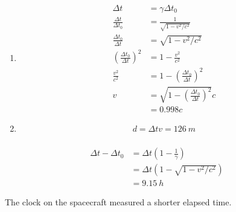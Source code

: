 \documentclass{article}
\begin{document}
\setcounter{subsubsection}{4}
\subsubsection{}

\begin{enumerate}
  \item

        \begin{align*}
          \Delta t                                     & = \gamma \Delta t_0                                         \\
          \frac{\Delta t}{\Delta t_0}                  & = \frac{1}{\sqrt{1 - v^2 / c^2}}                            \\
          \frac{\Delta t_0}{\Delta t}                  & = \sqrt{1 - v^2 / c^2}                                      \\
          \left( \frac{\Delta t_0}{\Delta t} \right)^2 & = 1 - \frac{v^2}{c^2}                                       \\
          \frac{v^2}{c^2}                              & = 1 - \left( \frac{\Delta t_0}{\Delta t} \right)^2          \\
          v                                            & = \sqrt{1 - \left( \frac{\Delta t_0}{\Delta t} \right)^2} c \\
                                                       & = 0.998 c
        \end{align*}

  \item \[d = \Delta t v = \qty{126}{m}\]
\end{enumerate}

\setcounter{subsubsection}{6}
\subsubsection{}

\begin{align*}
  \Delta t - \Delta t_0 & = \Delta t \left( 1 - \frac{1}{\gamma} \right) \\
                        & = \Delta t (1 - \sqrt{1 - v^2 / c^2})          \\
                        & = \qty{9.15}{h}
\end{align*}

The clock on the spacecraft measured a shorter elapsed time.

\setcounter{subsubsection}{8}
\subsubsection{}
\end{document}
